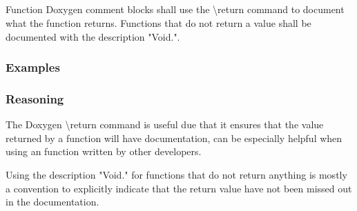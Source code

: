 \subsection*{\doxygenRule{}}

Function Doxygen comment blocks shall use the \textbackslash return command to document what the function returns. Functions that do not return a value shall be documented with the description "Void.".

\subsubsection*{Examples}

\noindent
\begin{minipage}[t]{0.48\textwidth}
    

\end{minipage}\hfill
\begin{minipage}[t]{0.48\textwidth}
    
\end{minipage}

\subsubsection*{Reasoning}

The Doxygen \textbackslash return command is useful due that it ensures that the value returned by a function will have documentation, can be especially helpful when using an function written by other developers.

Using the description "Void." for functions that do not return anything is mostly a convention to explicitly indicate that the return value have not been missed out in the documentation.